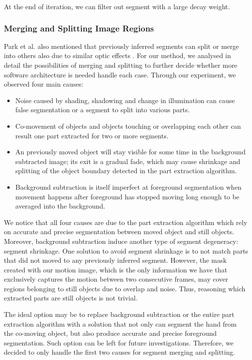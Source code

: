 \documentclass{article}
\begin{document}
At the end of iteration, we can filter out segment with a large decay weight.

\subsubsection{Merging and Splitting Image Regions}\label{sec:splitting}

Park et al. also mentioned that previously inferred segments can split or merge into others also due to similar optic effects \cite{human-action}. For our method, we analysed in detail the possibilities of merging and splitting to further decide whether more software architecture is needed handle each case. Through our experiment, we observed four main causes:
\begin{itemize}
	\item Noise caused by shading, shadowing and change in illumination can cause false segmentation or a segment to split into various parts. 
	\item Co-movement of objects and objects touching or overlapping each other can result one part extracted for two or more segments.
	\item An previously moved object will stay visible for some time in the background subtracted image; its exit is a gradual fade, which may cause shrinkage and splitting of the object boundary detected in the part extraction algorithm. 
	\item Background subtraction is itself imperfect at foreground segmentation when movement happens after foreground has stopped moving long enough to be averaged into the background.
\end{itemize}

We notice that all four causes are due to the part extraction algorithm which rely on accurate and precise segmentation between moved object and still objects. Moreover, background subtraction induce another type of segment degeneracy: segment shrinkage. One solution to avoid segment shrinkage is to not match parts that did not moved to any previously inferred segment. However, the mask created with our motion image, which is the only information we have that exclusively captures the motion between two consecutive frames, may cover regions belonging to still objects due to overlap and noise. Thus, reasoning which extracted parts are still objects is not trivial. 

The ideal option may be to replace background subtraction or the entire part extraction algorithm with a solution that not only can segment the hand from the co-moving object, but also produce accurate and precise foreground segmentation. Such option can be left for future investigations. Therefore, we decided to only handle the first two causes for segment merging and splitting.
\end{document}
